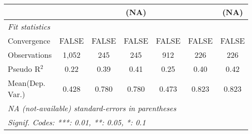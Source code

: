 \begin{tabular}{lcccccc}
                                                                              &                        &                        & (NA)                   &                        &                        & (NA)\\   
   \midrule
   \emph{Fit statistics}\\
   Convergence                                                                &FALSE                   & FALSE                  & FALSE                  & FALSE                  & FALSE                  & FALSE\\  
   Observations                                                               & 1,052                  & 245                    & 245                    & 912                    & 226                    & 226\\  
   Pseudo R$^2$                                                               & 0.22                   & 0.39                   & 0.41                   & 0.25                   & 0.40                   & 0.42\\  
Mean(Dep. Var.) & 0.428 & 0.780 & 0.780 & 0.473 & 0.823 & 0.823 \\
   \midrule \midrule
   \multicolumn{7}{l}{\emph{NA (not-available) standard-errors in parentheses}}\\
   \multicolumn{7}{l}{\emph{Signif. Codes: ***: 0.01, **: 0.05, *: 0.1}}\\
\end{tabular}
\par\endgroup
